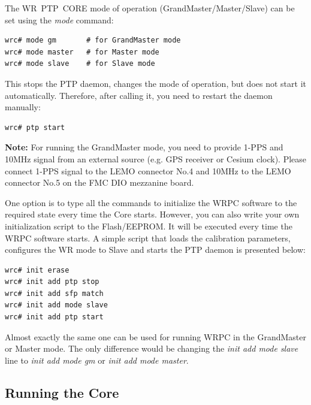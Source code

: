 \documentclass[a4paper, 12pt]{article}
\newcommand{\codeHook}[1]{\mbox{\ttfamily\MakeTextUppercase{#1}}}
\begin{document}
\vspace{1em}
The \codeHook{wr ptp core} mode of operation (GrandMaster/Master/Slave) can be set
using the \textit{mode} command:

\begin{lstlisting}
wrc# mode gm       # for GrandMaster mode
wrc# mode master   # for Master mode
wrc# mode slave    # for Slave mode
\end{lstlisting}

This stops the \codeHook{ptp} daemon, changes the mode of operation, but does not
start it automatically. Therefore, after calling it, you need to restart the
daemon manually:

\begin{lstlisting}
wrc# ptp start
\end{lstlisting}

\textbf{Note:} For running the GrandMaster mode, you need to provide 1-PPS and 10MHz
signal from an external source (e.g. GPS receiver or Cesium clock). Please
connect 1-PPS signal to the LEMO connector No.4 and 10MHz to the LEMO connector
No.5 on the \codeHook{fmc} \codeHook{dio} mezzanine board.

\vspace{1em}
One option is to type all the commands to initialize the \codeHook{wrpc} software to
the required state every time the Core starts. However, you can also write your
own initialization script to the Flash/EEPROM. It will be executed every time
the \codeHook{wrpc} software starts. A simple script that loads the calibration
parameters, configures the \codeHook{wr} mode to Slave and starts the \codeHook{ptp} daemon
is presented below:

\begin{lstlisting}
wrc# init erase
wrc# init add ptp stop
wrc# init add sfp match
wrc# init add mode slave
wrc# init add ptp start
\end{lstlisting}

Almost exactly the same one can be used for running \codeHook{wrpc} in the GrandMaster
or Master mode. The only difference would be changing the
\textit{init add mode slave} line to \textit{init add mode gm} or
\textit{init add mode master}.

\label{Running the Core}
\subsection{Running the Core}
\end{document}
